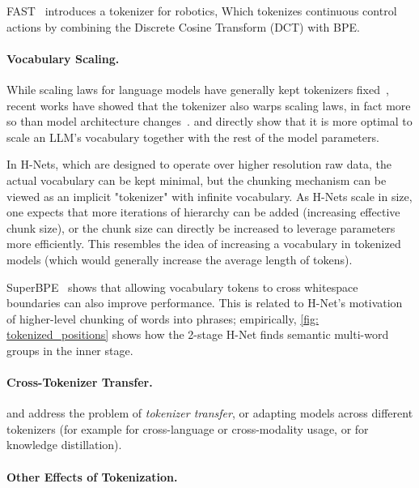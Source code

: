 FAST~\citep{lin2025autoregressive} introduces a tokenizer for robotics,
Which tokenizes continuous control actions by combining the Discrete Cosine Transform (DCT) with BPE.

\paragraph{Vocabulary Scaling.}
While scaling laws for language models have generally kept tokenizers fixed~\citep{ScalingLaw,Chinchilla,Llama3},
recent works have showed that the tokenizer also warps scaling laws, in fact more so than model architecture changes~\citep{mayilvahanan2025llms}.
\citet{tao2024scaling} and \citet{huang2025over}
directly show that it is more optimal to scale an LLM's vocabulary together with the rest of the model parameters.

In H-Nets, which are designed to operate over higher resolution raw data,
the actual vocabulary can be kept minimal,
but the chunking mechanism can be viewed as an implicit "tokenizer" with infinite vocabulary.
As H-Nets scale in size, one expects that more iterations of hierarchy can be added (increasing effective chunk size), or the chunk size can directly be increased to leverage parameters more efficiently.
This resembles the idea of increasing a vocabulary in tokenized models (which would generally increase the average length of tokens).

SuperBPE~\citep{liu2025superbpe} shows that allowing vocabulary tokens to cross whitespace boundaries can also improve performance.
This is related to H-Net's motivation of higher-level chunking of words into phrases; empirically, \cref{fig: tokenized_positions} shows how the 2-stage H-Net finds semantic multi-word groups in the inner stage.

\paragraph{Cross-Tokenizer Transfer.}

\citet{minixhofer2024zero} and \citet{minixhofer2025universal}
address the problem of \emph{tokenizer transfer}, or adapting models across different tokenizers (for example for cross-language or cross-modality usage, or for knowledge distillation).

\paragraph{Other Effects of Tokenization.}

